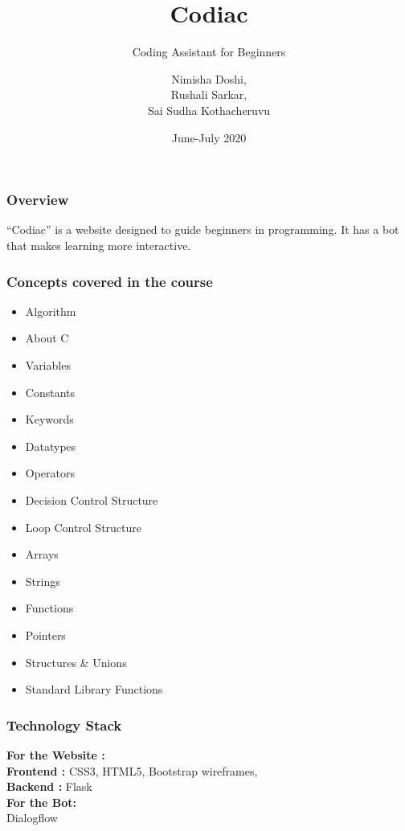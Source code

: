 \documentclass[14pt]{beamer}
\title[Codiac]{Codiac}
\subtitle[Coding Assitant]{Coding Assistant for Beginners}
\author[Team 2]{Nimisha Doshi, \\ Rushali Sarkar, \\ Sai Sudha Kothacheruvu}
\date[June 2020]{June-July 2020}
\begin{document}
\begin{frame}
    \titlepage
\end{frame}

\begin{frame}
    \frametitle{Overview}
    ``Codiac'' is a website designed to guide beginners in programming. It has a bot that makes learning more interactive.
\end{frame}

\begin{frame}
    \frametitle{Concepts covered in the course}
    \begin{itemize}
    \item  Algorithm  \\                       
    \item  About C \\           
    \item  Variables    \\
    \item  Constants   \\                     
    \item  Keywords      \\    
    \item  Datatypes \\
    \item  Operators   \\                      
    \item  Decision Control Structure \\
    \item  Loop Control Structure  \\
    \item  Arrays   \\
    \item  Strings\\ 
    \item  Functions   \\                         
    \item  Pointers          \\ 
    \item  Structures & Unions\\
    \item  Standard Library Functions\\
\end{itemize}    
\end{frame}


\begin{frame}
    \frametitle{Technology Stack}
        \textbf{For the Website :}\\
        \textbf{Frontend :} CSS3, HTML5, Bootstrap wireframes,\\
        \textbf{Backend  :} Flask \\
        \textbf{For the Bot:} \\
              Dialogflow \\
\end{frame}
\end{document}
